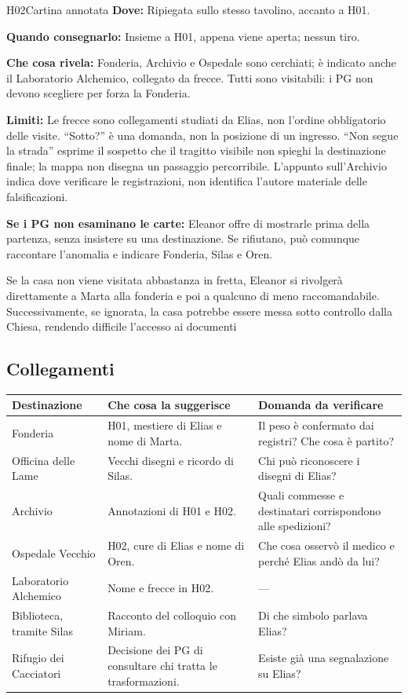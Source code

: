 \documentclass[11pt,a4paper]{article}
\begin{document}
{}
\begin{handoutbox}{H02}{Cartina annotata}
\textbf{Dove:} Ripiegata sullo stesso tavolino, accanto a H01.

\textbf{Quando consegnarlo:} Insieme a H01, appena viene aperta; nessun tiro.

\textbf{Che cosa rivela:} Fonderia, Archivio e Ospedale sono cerchiati; è indicato anche il Laboratorio Alchemico, collegato da frecce. Tutti sono visitabili: i PG non devono scegliere per forza la Fonderia.

\textbf{Limiti:} Le frecce sono collegamenti studiati da Elias, non l'ordine obbligatorio delle visite. ``Sotto?'' è una domanda, non la posizione di un ingresso. ``Non segue la strada'' esprime il sospetto che il tragitto visibile non spieghi la destinazione finale; la mappa non disegna un passaggio percorribile. L'appunto sull'Archivio indica dove verificare le registrazioni, non identifica l'autore materiale delle falsificazioni.
\end{handoutbox}

\textbf{Se i PG non esaminano le carte:} Eleanor offre di mostrarle prima della partenza, senza insistere su una destinazione. Se rifiutano, può comunque raccontare l'anomalia e indicare Fonderia, Silas e Oren.

\begin{clockbox}
Se la casa non viene visitata abbastanza in fretta, Eleanor si rivolgerà direttamente a Marta alla fonderia e poi a qualcuno di meno raccomandabile.
Successivamente, se ignorata, la casa potrebbe essere messa sotto controllo dalla Chiesa, rendendo difficile l'accesso ai documenti
\end{clockbox}

\subsection{Collegamenti}
\begin{longtable}{p{34mm} p{60mm} p{54mm}}
\toprule
\textbf{Destinazione} & \textbf{Che cosa la suggerisce} & \textbf{Domanda da verificare}\\
\midrule
Fonderia & H01, mestiere di Elias e nome di Marta. & Il peso è confermato dai registri? Che cosa è partito?\\
Officina delle Lame & Vecchi disegni e ricordo di Silas. & Chi può riconoscere i disegni di Elias?\\
Archivio & Annotazioni di H01 e H02. & Quali commesse e destinatari corrispondono alle spedizioni?\\
Ospedale Vecchio & H02, cure di Elias e nome di Oren. & Che cosa osservò il medico e perché Elias andò da lui?\\
Laboratorio Alchemico & Nome e frecce in H02. & ---\\
Biblioteca, tramite Silas & Racconto del colloquio con Miriam. & Di che simbolo parlava Elias?\\
Rifugio dei Cacciatori & Decisione dei PG di consultare chi tratta le trasformazioni. & Esiste già una segnalazione su Elias?\\
\bottomrule
\end{longtable}
\end{document}
